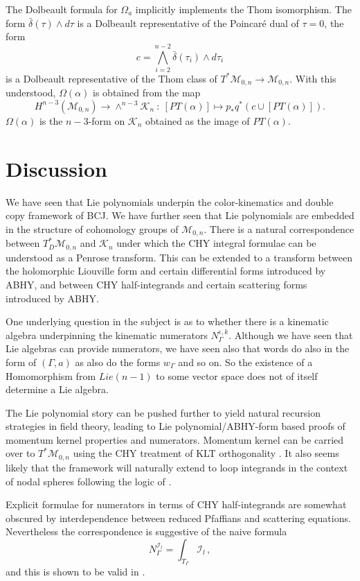 \documentclass[11pt]{article}
\newcommand{\cK}{\mathcal{K}}
\newcommand{\cI}{\mathcal{I}}
\newcommand{\cM}{\mathcal{M}}
\newcommand{\1}{{\rm 1\hskip-0.25em I}}
\begin{document}
The Dolbeault formula for $\Omega_a$ implicitly implements the Thom isomorphism. The form $\bar\delta(\tau)\wedge d\tau$ is a Dolbeault representative of the Poincar\'e dual of $\tau = 0$, the form
$$
c = \bigwedge_{i=2}^{n-2} \bar\delta(\tau_i) \wedge d\tau_i
$$
is a Dolbeault representative of the Thom class of $T^*\cM_{0,n}\rightarrow \cM_{0,n}$. With this understood, $\Omega(\alpha)$ is obtained from the map
$$
H^{n-3}(\cM_{0,n}) \rightarrow \wedge^{n-3}\cK_n ~:~ [PT(\alpha)] \mapsto p_* q^* \left(c \cup [PT(\alpha)]\right).
$$
$\Omega(\alpha)$ is the $n-3$-form on $\cK_n$ obtained as the image of $PT(\alpha)$.


\section{Discussion}
We have seen that Lie polynomials underpin the color-kinematics and double copy framework of BCJ.  We have further seen that Lie polynomials are embedded in the structure of cohomology groups of  $\cM_{0,n}$. There is a natural correspondence between $T^*_D\cM_{0,n}$ and $\cK_n$ under which the CHY integral formulae can be understood as a Penrose transform.  This can be extended to a transform between the holomorphic Liouville form and certain differential forms introduced by ABHY, and between CHY half-integrands and certain scattering forms introduced by ABHY.

One underlying question in the subject is as to whether there is a kinematic algebra underpinning the kinematic numerators $N_\Gamma^{\epsilon,k}$.  Although we have seen that Lie algebras can provide numerators, we have seen also that words do also in the form of $(\Gamma,a)$ as also do the forms $w_\Gamma$ and so on.  So the existence of a Homomorphism from $Lie(n-1)$ to some vector space does not of itself determine a Lie algebra.  



The Lie polynomial story can be pushed further to yield natural recursion strategies in field theory, leading to Lie polynomial/ABHY-form based proofs of momentum kernel properties and numerators.  Momentum kernel can be carried over to $T^*\cM_{0,n}$ using the CHY treatment of KLT orthogonality \cite{Cachazo:2013gna}.  It also seems likely that the framework will naturally extend to loop integrands in the context of nodal spheres following the logic of \cite{Geyer:2015bja}. 


 Explicit formulae for numerators  in terms of CHY half-integrands are somewhat  obscured by interdependence between reduced Pfaffians and scattering equations.  Nevertheless the  correspondence is suggestive of the
 naive formula
\begin{equation}
N^{\cI_l}_\Gamma=\int_{T_\Gamma}\cI_l\, ,
\end{equation}
and this is shown to be valid in \cite{Mizera:2019n}. 
\end{document}
